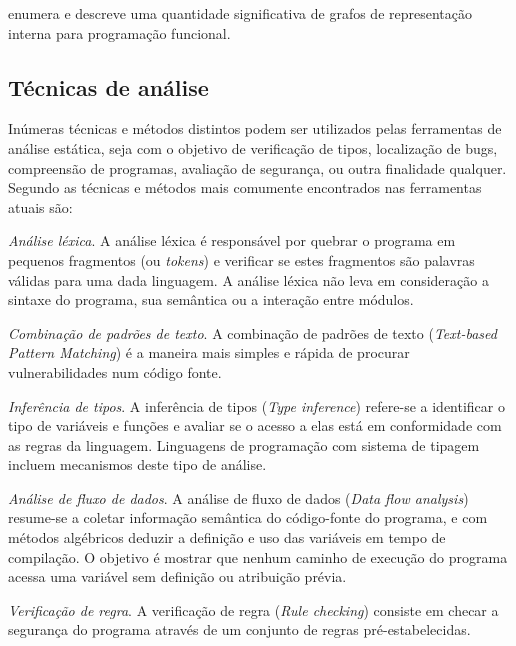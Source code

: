 enumera e descreve uma quantidade significativa de
grafos de representação interna para programação funcional.

\subsection{Técnicas de análise} \label{tecnicas}

Inúmeras técnicas e métodos distintos podem ser utilizados pelas ferramentas
de análise estática, seja com o objetivo de verificação de tipos, localização
de bugs, compreensão de programas, avaliação de segurança, ou outra finalidade
qualquer. Segundo  as técnicas e
métodos mais comumente encontrados nas ferramentas atuais são:

\begin{description}

  \item \textit{Análise léxica}.
    A análise léxica é responsável por quebrar o programa em pequenos fragmentos
    (ou {\it tokens}) e verificar se estes fragmentos são palavras válidas
    para uma dada linguagem. A análise léxica não leva em consideração a
    sintaxe do programa, sua semântica ou a interação entre módulos.

  \item \textit{Combinação de padrões de texto}.
    A combinação de padrões de texto ({\it Text-based Pattern Matching}) é a
    maneira mais simples e rápida de procurar vulnerabilidades num código
    fonte.

  \item \textit{Inferência de tipos}.
    A inferência de tipos ({\it Type inference}) refere-se a identificar o
    tipo de variáveis e funções e avaliar se o acesso a elas está em
    conformidade com as regras da linguagem. Linguagens de programação com
    sistema de tipagem incluem mecanismos deste tipo de análise.

  \item \textit{Análise de fluxo de dados}.
    A análise de fluxo de dados ({\it Data flow analysis}) resume-se a coletar
    informação semântica do código-fonte do programa, e com métodos algébricos
    deduzir a definição e uso das variáveis em tempo de compilação. O objetivo
    é mostrar que nenhum caminho de execução do programa acessa uma variável
    sem definição ou atribuição prévia.

  \item \textit{Verificação de regra}.
    A verificação de regra ({\it Rule checking}) consiste em checar a segurança
    do programa através de um conjunto de regras pré-estabelecidas.


\end{description}
